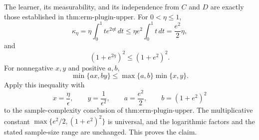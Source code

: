 The learner, its measurability, and its independence from \(C\) and \(D\) are exactly those established in \(\text{thm:erm-plugin-upper}\). For \(0<\eta\le1\),
\[
\kappa_\eta
=\eta\int_0^1 t e^{2\eta t}\,dt
\le \eta e^2\int_0^1t\,dt
=\frac{e^2}{2}\eta,
\]
and
\[
(1+e^{2\eta})^2\le(1+e^2)^2.
\]
For nonnegative \(x,y\) and positive \(a,b\),
\[
\min\{ax,by\}\le\max\{a,b\}\min\{x,y\}.
\]
Apply this inequality with
\[
x=\frac\eta\epsilon,\qquad y=\frac1{\epsilon^2},\qquad a=\frac{e^2}{2},\qquad b=(1+e^2)^2
\]
to the sample-complexity conclusion of \(\text{thm:erm-plugin-upper}\). The multiplicative constant \(\max\{e^2/2,(1+e^2)^2\}\) is universal, and the logarithmic factors and the stated sample-size range are unchanged. This proves the claim.